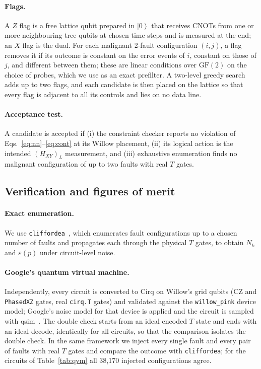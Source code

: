 \documentclass[aps,pra,reprint,superscriptaddress,longbibliography]{revtex4-2}
\newcommand{\ket}[1]{\left|#1\right\rangle}
\newcommand{\HXY}{H_{XY}}
\begin{document}
\paragraph{Flags.}
A $Z$ flag is a free lattice qubit prepared in $\ket0$ that receives CNOTs from one or more neighbouring tree qubits at chosen time steps and is measured at the end; an $X$ flag is the dual.
For each malignant 2-fault configuration $(i,j)$, a flag removes it if its outcome is constant on the error events of $i$, constant on those of $j$, and different between them; these are linear conditions over $\mathrm{GF}(2)$ on the choice of probes, which we use as an exact prefilter.
A two-level greedy search adds up to two flags, and each candidate is then placed on the lattice so that every flag is adjacent to all its controls and lies on no data line.

\paragraph{Acceptance test.}
A candidate is accepted if (i) the constraint checker reports no violation of Eqs.~\eqref{eq:nn}--\eqref{eq:cont} at its Willow placement, (ii) its logical action is the intended $(\HXY)_L$ measurement, and (iii) exhaustive enumeration finds no malignant configuration of up to two faults with real $T$ gates.

\subsection{Verification and figures of merit}

\paragraph{Exact enumeration.}
We use \texttt{cliffordea}~\cite{cliffordea}, which enumerates fault configurations up to a chosen number of faults and propagates each through the physical $T$ gates, to obtain $N_k$ and $\varepsilon(p)$ under circuit-level noise.

\paragraph{Google's quantum virtual machine.}
Independently, every circuit is converted to Cirq on Willow's grid qubits (CZ and \texttt{PhasedXZ} gates, real \texttt{cirq.T} gates) and validated against the \texttt{willow\_pink} device model; Google's noise model for that device is applied and the circuit is sampled with qsim~\cite{cirq,qsim}.
The double check starts from an ideal encoded $T$ state and ends with an ideal decode, identically for all circuits, so that the comparison isolates the double check.
In the same framework we inject every single fault and every pair of faults with real $T$ gates and compare the outcome with \texttt{cliffordea}; for the circuits of Table~\ref{tab:qvm} all 38,170 injected configurations agree.
\end{document}
